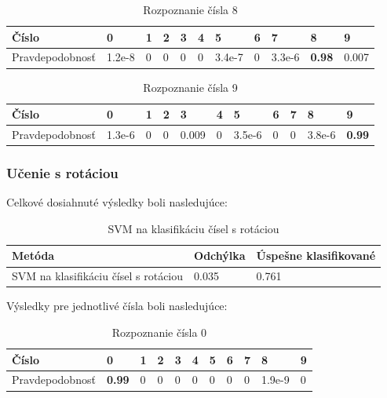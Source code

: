 \begin{table}[H]
  \begin{tabular}{ | l | l | l | l | l | l | l | l | l | l | l |}
    \hline
    Číslo & 0 & 1 & 2 & 3 & 4 & 5 & 6 & 7 & 8 & 9 \\ \hline
    Pravdepodobnosť & 1.2e-8 & 0 & 0 & 0 & 0 & 3.4e-7 & 0 & 3.3e-6 & \textbf{0.98} & 0.007 \\
    \hline
  \end{tabular}
  \caption[Rozpoznanie čísla 8]{Rozpoznanie čísla 8}
\end{table}

\begin{table}[H]
  \begin{tabular}{ | l | l | l | l | l | l | l | l | l | l | l |}
    \hline
    Číslo & 0 & 1 & 2 & 3 & 4 & 5 & 6 & 7 & 8 & 9 \\ \hline
    Pravdepodobnosť & 1.3e-6 & 0 & 0 & 0.009 & 0 & 3.5e-6 & 0 & 0 & 3.8e-6 & \textbf{0.99} \\
    \hline
  \end{tabular}
  \caption[Rozpoznanie čísla 9]{Rozpoznanie čísla 9}
\end{table}

\newpage
\subsubsection{Učenie s rotáciou} %

Celkové dosiahnuté výsledky boli nasledujúce:

\begin{table}[H]
  \begin{tabular}{ | l | l | l |}
    \hline
    Metóda & Odchýlka & Úspešne klasifikované \\ \hline
    SVM na klasifikáciu čísel s rotáciou & 0.035 & 0.761 \\
    \hline
  \end{tabular}
  \caption[SVM na klasifikáciu čísel s rotáciou]{SVM na klasifikáciu čísel s rotáciou}
\end{table}

Výsledky pre jednotlivé čísla boli nasledujúce:

\begin{table}[H]
  \begin{tabular}{ | l | l | l | l | l | l | l | l | l | l | l |}
    \hline
    Číslo & 0 & 1 & 2 & 3 & 4 & 5 & 6 & 7 & 8 & 9 \\ \hline
    Pravdepodobnosť & \textbf{0.99} & 0 & 0 & 0 & 0 & 0 & 0 & 0 & 1.9e-9 & 0 \\
    \hline
  \end{tabular}
  \caption[Rozpoznanie čísla 0]{Rozpoznanie čísla 0}
\end{table}

